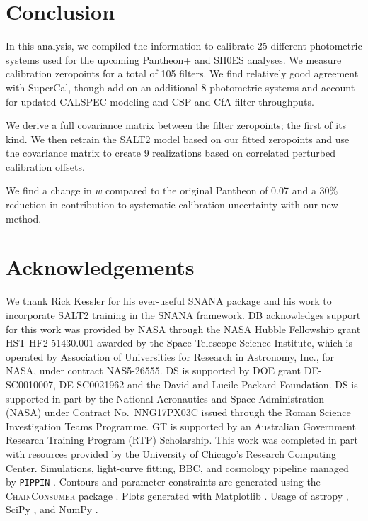 \documentclass[twocolumn]{aastex63}
\newcommand{\blue}{\color{black}}
\begin{document}
\section{Conclusion}

In this analysis, we compiled the information to calibrate 25 different photometric systems used for the upcoming Pantheon+ and SH0ES analyses.  We measure calibration zeropoints for a total of 105 filters.  We find relatively good agreement with SuperCal, though add on an additional 8 photometric systems and account for updated CALSPEC modeling and CSP and CfA filter throughputs.  

We derive a full covariance matrix between the filter zeropoints; the first of its kind. We then retrain the SALT2 model based on our fitted zeropoints and use the covariance matrix to create 9 realizations based on correlated perturbed calibration offsets.  

{\blue We find a change in $w$ compared to the original Pantheon of 0.07 and a 30\% reduction in contribution to systematic calibration uncertainty with our new method.}

\newpage

\newpage


\newpage


   


    
   


\section{Acknowledgements}
 We thank Rick Kessler for his ever-useful SNANA package and his work to incorporate SALT2 training in the SNANA framework.
 DB acknowledges support for this work was provided by NASA through the NASA Hubble Fellowship grant HST-HF2-51430.001 awarded by the Space Telescope Science Institute, which is operated by Association of Universities for Research in Astronomy, Inc., for NASA, under contract NAS5-26555. DS is supported by DOE grant DE-SC0010007, DE-SC0021962 and the David and Lucile Packard Foundation. DS is supported in part by the National Aeronautics and Space Administration (NASA) under Contract No.~NNG17PX03C issued through the Roman Science Investigation Teams Programme. GT is supported by an Australian Government Research Training Program (RTP) Scholarship. This work was completed in part with resources provided by the University of Chicago’s Research Computing Center. Simulations, light-curve fitting, BBC, and cosmology pipeline managed by \texttt{PIPPIN} \citep{Pippin}. Contours and parameter constraints are generated using the \textsc{ChainConsumer} package \citep{Hinton16}. Plots generated with Matplotlib \citep{matplotlib}. Usage of astropy \citep{astropy}, SciPy \citep{scipy}, and NumPy \citep{numpy}.
 
\end{document}
